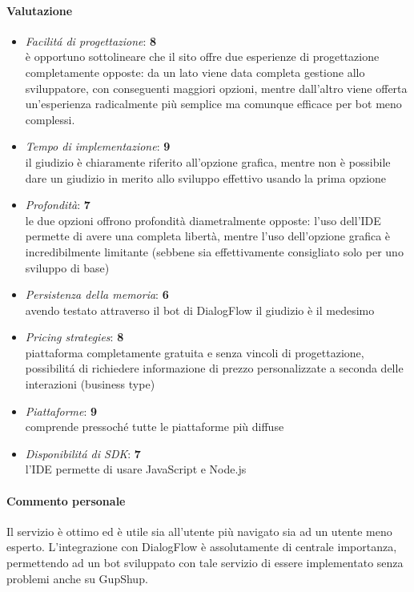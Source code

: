 \documentclass[]{article}
\begin{document}
\paragraph{Valutazione}
\begin{itemize}
\item \textit{Facilitá di progettazione}: \textbf{8} \\ è opportuno sottolineare che il sito offre due esperienze di progettazione completamente opposte: da un lato viene data completa gestione allo sviluppatore, con conseguenti maggiori opzioni, mentre dall’altro viene offerta un’esperienza radicalmente più semplice ma comunque efficace per bot meno complessi.
\item \textit{Tempo di implementazione}: \textbf{9} \\ il giudizio è chiaramente riferito all’opzione grafica, mentre non è possibile dare un giudizio in merito allo sviluppo effettivo usando la prima opzione
\item \textit{Profondità}: \textbf{7} \\  le due opzioni offrono profondità diametralmente opposte: l’uso dell’IDE permette di avere una completa libertà, mentre l’uso dell’opzione grafica è incredibilmente limitante (sebbene sia effettivamente consigliato solo per uno sviluppo di base)
\item \textit{Persistenza della memoria}: \textbf{6} \\ avendo testato attraverso il bot di DialogFlow il giudizio è il medesimo
\item \textit{Pricing strategies}: \textbf{8} \\  piattaforma completamente gratuita e senza vincoli di progettazione, possibilitá di richiedere informazione di prezzo personalizzate a seconda delle interazioni (business type)
\item \textit{Piattaforme}: \textbf{9} \\ comprende pressoché tutte le piattaforme più diffuse
\item \textit{Disponibilitá di SDK}: \textbf{7} \\ l’IDE permette di usare JavaScript e Node.js
\end{itemize}

\paragraph{Commento personale}
Il servizio è ottimo ed è utile sia all’utente più navigato sia ad un utente meno esperto. L’integrazione con DialogFlow è assolutamente di centrale importanza, permettendo ad un bot sviluppato con tale servizio di essere implementato senza problemi anche su GupShup.
\end{document}
